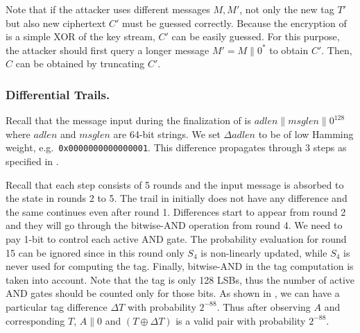Note that if the attacker uses different messages $M,M'$, not only the new tag $T'$ but also new ciphertext $C'$ must be guessed correctly. Because the encryption of \MORUS is a simple XOR of the key stream, $C'$ can be easily guessed. For this purpose, the attacker should first query a longer message $M'=M\|0^*$ to obtain $C'$. Then, $C$ can be obtained by truncating $C'$.

\subsubsection{Differential Trails.}
Recall that the message input during the finalization of \MORUS[1280] is $adlen\|msglen\|0^{128}$ where $adlen$ and $msglen$ are 64-bit strings. We set $\Delta adlen$ to be of low Hamming weight, e.g.~{\tt 0x0000000000000001}. 
This difference propagates through 3 steps as specified in .

Recall that each step consists of 5 rounds and the input message is absorbed to the state in rounds 2 to 5. The trail in  initially does not have any difference and the same continues even after round 1. Differences start to appear from round 2 and they will go through the bitwise-AND operation from round 4. We need to pay 1-bit to control each active AND gate. The probability evaluation for round 15 can be ignored since in this round only $S_4$ is non-linearly updated, while $S_4$ is never used for computing the tag. Finally, bitwise-AND in the tag computation is taken into account. Note that the tag is only 128 LSBs, thus the number of active AND gates should be counted only for those bits. As shown in , we can have a particular tag difference $\Delta T$ with probability $2^{-88}$. Thus after observing $A$ and corresponding $T$, $A\|0$ and $(T \oplus \Delta T)$ is a valid pair with probability $2^{-88}$.

